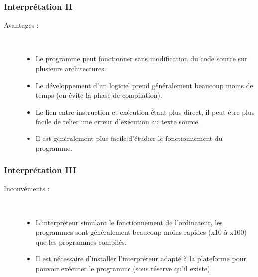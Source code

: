 \documentclass[utf8,10pt]{beamer}
\begin{document}
\begin{frame}
    \frametitle{Interprétation II}
    \begin{description}
        \item[Avantages :]\hspace{1cm}\\
        \begin{itemize}
            \item Le programme peut fonctionner sans modification du code source sur plusieurs architectures. 
            \item Le développement d’un logiciel prend généralement beaucoup moins de temps (on évite la 
            phase de compilation).
            \item Le lien entre instruction et exécution étant plus direct, il peut être plus facile 
            de relier une erreur d’exécution au texte source.
            \item Il est généralement plus facile \og d’étudier \fg{} le fonctionnement du programme.
        \end{itemize}
    \end{description}
    
\end{frame}


\begin{frame}
    \frametitle{Interprétation III}
    \begin{description}
        \item[Inconvénients :]\hspace{1cm}\\
        \begin{itemize}
            \item L’interpréteur simulant le fonctionnement de l’ordinateur, les programmes sont 
            généralement beaucoup moins rapides (x10 à x100) que les programmes compilés.
            \item Il est nécessaire d’installer l’interpréteur adapté à la plateforme pour pouvoir 
            exécuter le programme (sous réserve qu'il existe).
        \end{itemize}
    \end{description}
    
\end{frame}
\end{document}
